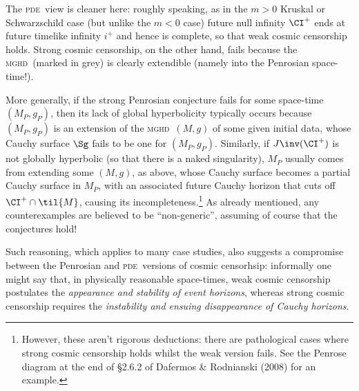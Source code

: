 \documentclass[11pt,a4paper]{article}
\newcommand{\mghd}{\textsc{mghd}}
\newcommand{\pde}{\textsc{pde}}
\begin{document}
\begin{itemize}
  The \pde\ view is cleaner here: roughly speaking, as in the $m>0$ Kruskal or Schwarzschild case (but unlike the $m<0$ case) future null infinity $\CI^+$ ends at future timelike infinity $i^+$ and hence is complete, so that weak  cosmic censorship holds. Strong  cosmic censorship, on the other hand, fails because the \mghd\ (marked in grey) is clearly extendible (namely into the Penrosian space-time!). 
\end{itemize}
More generally, if the strong Penrosian conjecture fails for some space-time $(M_P,g_P)$, then its lack of global hyperbolicity  typically occurs because $(M_P,g_P)$ is an extension of the \mghd\ $(M,g)$ of some given initial data, whose Cauchy surface $\Sg$ fails to be one for  $(M_P,g_P)$.
Similarly, if $J\inv(\CI^+)$ is not globally hyperbolic (so that there is a naked singularity), $M_P$ usually comes from extending some $(M,g)$, as above, whose Cauchy surface becomes a partial  Cauchy surface in $M_P$, with an associated future Cauchy horizon that cuts off $\CI^+\cap\til{M}$, causing its incompleteness.\footnote{However, these aren't rigorous deductions: there are pathological cases where strong cosmic censorship holds whilst the weak version fails. See the Penrose diagram at the end of \S 2.6.2 of Dafermos \& Rodnianski (2008) for an example.} 
As already mentioned, any counterexamples are believed to be ``non-generic'', assuming of course that the conjectures hold! 

Such reasoning, which applies to many case studies,  also suggests a compromise between the Penrosian and \pde\ versions of cosmic censorhsip: informally  one might say that, in physically reasonable space-times, weak cosmic censorship postulates the \emph{appearance and stability of event horizons}, whereas  strong cosmic censorship requires the \emph{instability and ensuing disappearance of Cauchy horizons}.
\end{document}

